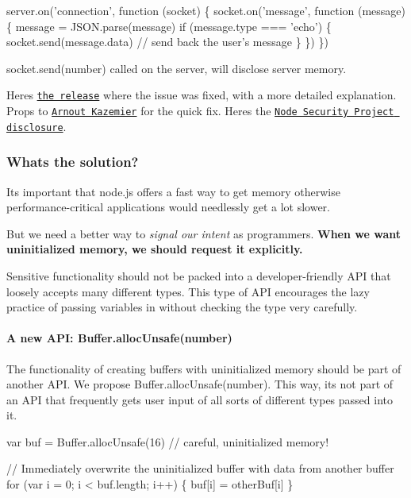 \begin{DoxyCode}
server.on('connection', function (socket) \{
  socket.on('message', function (message) \{
    message = JSON.parse(message)
    if (message.type === 'echo') \{
      socket.send(message.data) // send back the user's message
    \}
  \})
\})
\end{DoxyCode}


{\ttfamily socket.\+send(number)} called on the server, will disclose server memory.

Here\textquotesingle{}s \href{https://github.com/websockets/ws/releases/tag/1.0.1}{\tt the release} where the issue was fixed, with a more detailed explanation. Props to \href{https://github.com/3rd-Eden}{\tt Arnout Kazemier} for the quick fix. Here\textquotesingle{}s the \href{https://nodesecurity.io/advisories/67}{\tt Node Security Project disclosure}.

\subsubsection*{What\textquotesingle{}s the solution?}

It\textquotesingle{}s important that node.\+js offers a fast way to get memory otherwise performance-\/critical applications would needlessly get a lot slower.

But we need a better way to {\itshape signal our intent} as programmers. {\bfseries When we want uninitialized memory, we should request it explicitly.}

Sensitive functionality should not be packed into a developer-\/friendly A\+PI that loosely accepts many different types. This type of A\+PI encourages the lazy practice of passing variables in without checking the type very carefully.

\paragraph*{A new A\+PI\+: {\ttfamily Buffer.\+alloc\+Unsafe(number)}}

The functionality of creating buffers with uninitialized memory should be part of another A\+PI. We propose {\ttfamily Buffer.\+alloc\+Unsafe(number)}. This way, it\textquotesingle{}s not part of an A\+PI that frequently gets user input of all sorts of different types passed into it.


\begin{DoxyCode}
var buf = Buffer.allocUnsafe(16) // careful, uninitialized memory!

// Immediately overwrite the uninitialized buffer with data from another buffer
for (var i = 0; i < buf.length; i++) \{
  buf[i] = otherBuf[i]
\}
\end{DoxyCode}


